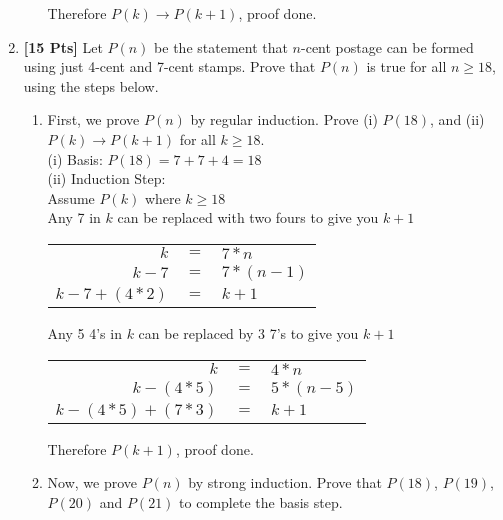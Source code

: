 \begin{enumerate}
\begin{enumerate}
Therefore $P(k) \rightarrow P(k+1)$, proof done.\\

\end{enumerate}

\clearpage

\item {\bf [15 Pts]} Let $P(n)$ be the statement that $n$-cent postage can be formed using just 
4-cent and 7-cent stamps. Prove that $P(n)$ is true for all $n \geq 18$, using the steps below.

\begin{enumerate}

\item First, we prove $P(n)$ by regular induction. Prove (i) $P(18)$, and (ii) $P(k) \rightarrow P(k+1)$ for all $k \geq 18$.\\

(i) Basis: $P(18) = 7+7+4 = 18$\\
(ii) Induction Step:\\
Assume $P(k)$ where $k \geq 18$\\

Any 7 in $k$ can be replaced with two fours to give you $k+1$ 

\begin{table}[h]
\centering
\begin{tabular}{rcl}
$k$         & $=$ & $7*n$     \\
$k-7$       & $=$ & $7*(n-1)$ \\
$k-7+(4*2)$ & $=$ & $k+1$    
\end{tabular}
\end{table}

Any 5 4's  in $k$ can be replaced by 3 7's to give you $k+1$

\begin{table}[h]
\centering
\begin{tabular}{rcl}
$k$             & $=$ & $4*n$     \\
$k-(4*5)$       & $=$ & $5*(n-5)$ \\
$k-(4*5)+(7*3)$ & $=$ & $k+1$    
\end{tabular}
\end{table}

Therefore $P(k+1)$, proof done.\\

\item Now, we prove $P(n)$ by strong induction. Prove that $P(18)$, $P(19)$, $P(20)$ and 
$P(21)$ to complete the basis step.\\


\end{enumerate}
\end{enumerate}
